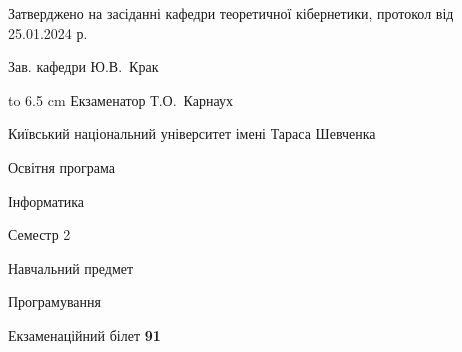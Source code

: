 \documentclass[12pt, ukrainian]{article}
\begin{document}
{\smallskip\smallskip \begin {scriptsize} Затверджено на засіданні кафедри теоретичної кібернетики, протокол   від   25.01.2024 р.\par\smallskip\smallskip\smallskip\smallskip
{\parbox {6.5 cm} {Зав. кафедри \dotfill Ю.В.~Крак}}\hspace {0.7cm} {\hbox to 6.5 cm { Екзаменатор \dotfill Т.О.~Карнаух}} \end{scriptsize}}
\newpage
{{\begin {scriptsize}\par
{ \center  Київський національний університет імені Тараса Шевченка \par}
{\parbox {5 cm}{Освітня програма \hfill}{\parbox {7 cm}{Інформатика\hfill}}\parbox {6 cm}{\hfill Семестр 2}}\par
{\parbox {5 cm} {Навчальний предмет \hfill}\parbox {7 cm}{Програмування \hfill}\parbox {6cm}{\hfill}\par}\vspace{-15pt} \end{scriptsize}}{\center Екзаменаційний білет \No \textbf { 91 }\par}}
\end{document}
